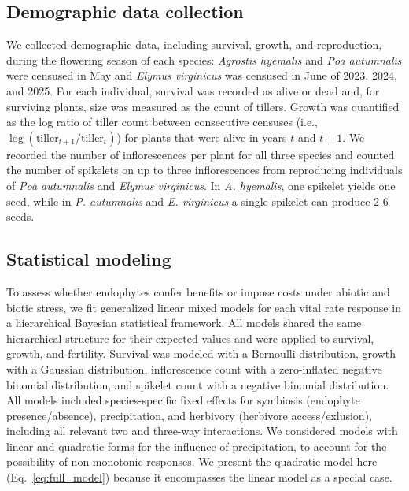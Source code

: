 \documentclass[12pt]{article}\usepackage[]{graphicx}\usepackage[dvipsnames]{xcolor}
\begin{document}
\subsection*{Demographic data collection}
We collected demographic data, including survival, growth, and reproduction, during the flowering season of each species: \emph{Agrostis hyemalis} and \emph{Poa autumnalis} were censused in May and \emph{Elymus virginicus} was censused in June of 2023, 2024, and 2025.
For each individual, survival was recorded as alive or dead and, for surviving plants, size was measured as the count of tillers.  
Growth was quantified as the log ratio of tiller count between consecutive censuses (i.e., $\log(\text{tiller}_{t+1}/\text{tiller}_{t})$) for plants that were alive in years $t$ and $t+1$.
We recorded the number of inflorescences per plant for all three species and counted the number of spikelets on up to three inflorescences from reproducing individuals of \emph{Poa autumnalis} and \emph{Elymus virginicus}. 
In \emph{A. hyemalis}, one spikelet yields one seed, while in \emph{P. autumnalis} and \emph{E. virginicus} a single spikelet can produce 2-6 seeds. 

\subsection*{Statistical modeling}
To assess whether endophytes confer benefits or impose costs under abiotic and biotic stress, we fit generalized linear mixed models for each vital rate response in a hierarchical Bayesian statistical framework. %
All models shared the same hierarchical structure for their expected values and were applied to survival, growth, and fertility.
Survival was modeled with a Bernoulli distribution, growth with a Gaussian distribution, inflorescence count with a zero-inflated negative binomial distribution, and spikelet count with a negative binomial distribution.
All models included species-specific fixed effects for symbiosis (endophyte presence/absence), precipitation, and herbivory (herbivore access/exlusion), including all relevant two and three-way interactions. 
We considered models with linear and quadratic forms for the influence of precipitation, to account for the possibility of non-monotonic responses. 
We present the quadratic model here (Eq.~\ref{eq:full_model}) because it encompasses the linear model as a special case. 
\end{document}
